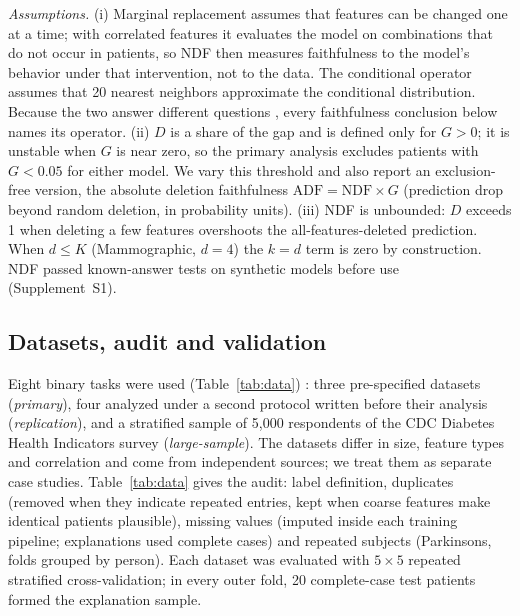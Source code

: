 \emph{Assumptions.} (i) Marginal replacement assumes that features can be changed one at a time; with correlated features it evaluates the model on combinations that do not occur in patients, so NDF then measures faithfulness to the model's behavior under that intervention, not to the data. The conditional operator assumes that 20 nearest neighbors approximate the conditional distribution. Because the two answer different questions \cite{chen}, every faithfulness conclusion below names its operator. (ii) $D$ is a share of the gap and is defined only for $G>0$; it is unstable when $G$ is near zero, so the primary analysis excludes patients with $G<0.05$ for either model. We vary this threshold and also report an exclusion-free version, the absolute deletion faithfulness $\mathrm{ADF}=\mathrm{NDF}\times G$ (prediction drop beyond random deletion, in probability units). (iii) NDF is unbounded: $D$ exceeds 1 when deleting a few features overshoots the all-features-deleted prediction. When $d\le K$ (Mammographic, $d=4$) the $k=d$ term is zero by construction. NDF passed known-answer tests on synthetic models before use (Supplement~S1).

\subsection{Datasets, audit and validation}
Eight binary tasks were used (Table~\ref{tab:data}) \cite{street,antal,detrano,little,uci_repo,uci_cdc,brfss}: three pre-specified datasets (\emph{primary}), four analyzed under a second protocol written before their analysis (\emph{replication}), and a stratified sample of 5{,}000 respondents of the CDC Diabetes Health Indicators survey (\emph{large-sample}). The datasets differ in size, feature types and correlation and come from independent sources; we treat them as separate case studies. Table~\ref{tab:data} gives the audit: label definition, duplicates (removed when they indicate repeated entries, kept when coarse features make identical patients plausible), missing values (imputed inside each training pipeline; explanations used complete cases) and repeated subjects (Parkinsons, folds grouped by person). Each dataset was evaluated with $5\times5$ repeated stratified cross-validation; in every outer fold, 20 complete-case test patients formed the explanation sample.

